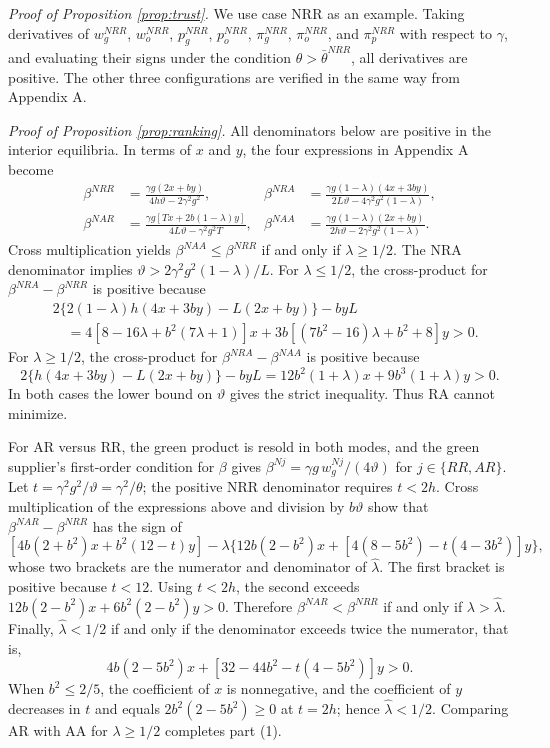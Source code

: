 \documentclass[preprint,review,12pt,authoryear,nopreprintline]{elsarticle}
\theoremstyle{definition}
\begin{document}
\noindent \textit{Proof of Proposition \ref{prop:trust}.}
We use case NRR as an example. Taking derivatives of $w_g^{NRR}$, $w_o^{NRR}$, $p_g^{NRR}$, $p_o^{NRR}$, $\pi_g^{NRR}$, $\pi_o^{NRR}$, and $\pi_p^{NRR}$ with respect to $\gamma$, and evaluating their signs under the condition $\theta>\bar{\theta}^{NRR}$, all derivatives are positive. The other three configurations are verified in the same way from Appendix A.

\noindent \textit{Proof of Proposition \ref{prop:ranking}.}
All denominators below are positive in the interior equilibria. In terms of $x$ and $y$, the four expressions in Appendix A become
\begin{align*}
\beta^{NRR}&=\frac{\gamma g(2x+by)}{4h\vartheta-2\gamma^2g^2},&
\beta^{NRA}&=\frac{\gamma g(1-\lambda)(4x+3by)}
 {2L\vartheta-4\gamma^2g^2(1-\lambda)},\\
\beta^{NAR}&=\frac{\gamma g[Tx+2b(1-\lambda)y]}
 {4L\vartheta-\gamma^2g^2T},&
\beta^{NAA}&=\frac{\gamma g(1-\lambda)(2x+by)}
 {2h\vartheta-2\gamma^2g^2(1-\lambda)}.
\end{align*}
Cross multiplication yields $\beta^{NAA}\leq\beta^{NRR}$ if and only if $\lambda\geq1/2$. The NRA denominator implies $\vartheta>2\gamma^2g^2(1-\lambda)/L$. For $\lambda\leq1/2$, the cross-product for $\beta^{NRA}-\beta^{NRR}$ is positive because
\begin{align*}
&2\{2(1-\lambda)h(4x+3by)-L(2x+by)\}-byL\\
&\quad=4[8-16\lambda+b^2(7\lambda+1)]x
+3b[(7b^2-16)\lambda+b^2+8]y>0.
\end{align*}
For $\lambda\geq1/2$, the cross-product for $\beta^{NRA}-\beta^{NAA}$ is positive because
\[
2\{h(4x+3by)-L(2x+by)\}-byL
=12b^2(1+\lambda)x+9b^3(1+\lambda)y>0.
\]
In both cases the lower bound on $\vartheta$ gives the strict inequality. Thus RA cannot minimize.

For AR versus RR, the green product is resold in both modes, and the green supplier's first-order condition for $\beta$ gives $\beta^{Nj}=\gamma g\,w_g^{Nj}/(4\vartheta)$ for $j\in\{RR,AR\}$. Let $t=\gamma^2g^2/\vartheta=\gamma^2/\theta$; the positive NRR denominator requires $t<2h$. Cross multiplication of the expressions above and division by $b\vartheta$ show that $\beta^{NAR}-\beta^{NRR}$ has the sign of
\[
[4b(2+b^2)x+b^2(12-t)y]-\lambda\{12b(2-b^2)x+[4(8-5b^2)-t(4-3b^2)]y\},
\]
whose two brackets are the numerator and denominator of $\hat{\lambda}$. The first bracket is positive because $t<12$. Using $t<2h$, the second exceeds $12b(2-b^2)x+6b^2(2-b^2)y>0$. Therefore $\beta^{NAR}<\beta^{NRR}$ if and only if $\lambda>\hat{\lambda}$. Finally, $\hat{\lambda}<1/2$ if and only if the denominator exceeds twice the numerator, that is,
\[
4b(2-5b^2)x+[32-44b^2-t(4-5b^2)]y>0.
\]
When $b^2\leq2/5$, the coefficient of $x$ is nonnegative, and the coefficient of $y$ decreases in $t$ and equals $2b^2(2-5b^2)\geq0$ at $t=2h$; hence $\hat{\lambda}<1/2$. Comparing AR with AA for $\lambda\geq1/2$ completes part (1).
\end{document}
